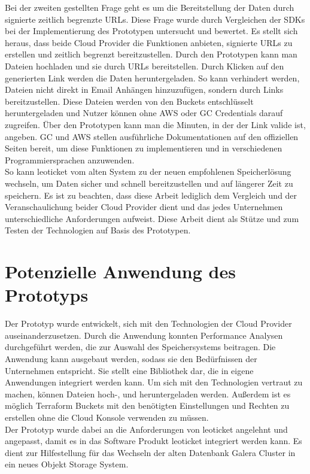 Bei der zweiten gestellten Frage geht es um die Bereitstellung der Daten durch signierte zeitlich begrenzte URLs. Diese Frage wurde durch Vergleichen der SDKs bei der Implementierung des Prototypen untersucht und bewertet. Es stellt sich heraus, dass beide Cloud Provider die Funktionen anbieten, signierte URLs zu erstellen und zeitlich begrenzt bereitzustellen. Durch den Prototypen kann man Dateien hochladen und sie durch URLs bereitstellen. Durch Klicken auf den generierten Link werden die Daten heruntergeladen. So kann verhindert werden, Dateien nicht direkt in Email Anhängen hinzuzufügen, sondern durch Links bereitzustellen. Diese Dateien werden von den Buckets entschlüsselt heruntergeladen und Nutzer können ohne AWS oder GC Credentials darauf zugreifen. Über den Prototypen kann man die Minuten, in der der Link valide ist, angeben. GC und AWS stellen ausführliche Dokumentationen auf den offiziellen Seiten bereit, um diese Funktionen zu implementieren und in verschiedenen Programmiersprachen anzuwenden.\\

So kann leoticket vom alten System zu der neuen empfohlenen Speicherlösung wechseln, um Daten sicher und schnell bereitzustellen und auf längerer Zeit zu speichern. Es ist zu beachten, dass diese Arbeit lediglich dem Vergleich und der Veranschaulichung beider Cloud Provider dient und das jedes Unternehmen unterschiedliche Anforderungen aufweist. Diese Arbeit dient als Stütze und zum Testen der Technologien auf Basis des Prototypen. 

\section{Potenzielle Anwendung des Prototyps}

Der Prototyp wurde entwickelt, sich mit den Technologien der Cloud Provider auseinanderzusetzen. Durch die Anwendung konnten Performance Analysen durchgeführt werden, die zur Auswahl des Speichersystems beitragen. Die Anwendung kann ausgebaut werden, sodass sie den Bedürfnissen der Unternehmen entspricht. Sie stellt eine Bibliothek dar, die in eigene Anwendungen integriert werden kann. Um sich mit den Technologien vertraut zu machen, können Dateien hoch-, und heruntergeladen werden. Außerdem ist es möglich Terraform Buckets mit den benötigten Einstellungen und Rechten zu erstellen ohne die Cloud Konsole verwenden zu müssen.\\

Der Prototyp wurde dabei an die Anforderungen von leoticket angelehnt und angepasst, damit es in das Software Produkt leoticket integriert werden kann. Es dient zur Hilfestellung für das Wechseln der alten Datenbank Galera Cluster in ein neues Objekt Storage System. 
